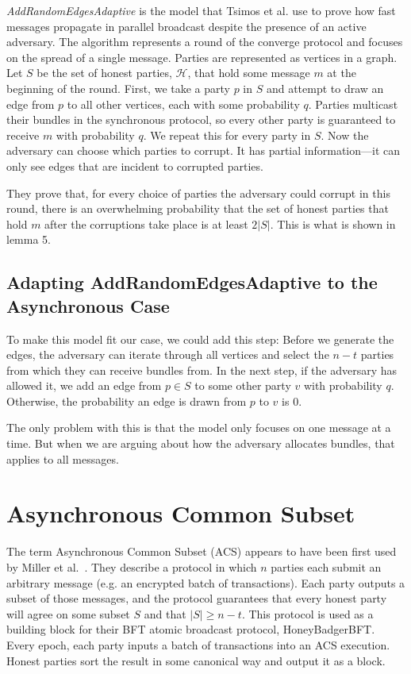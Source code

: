 \documentclass{article}
\begin{document}
\emph{AddRandomEdgesAdaptive} is the model that Tsimos et al. \cite{PBC} use to prove how fast messages propagate in parallel broadcast despite the presence of an active adversary. The algorithm represents a round of the converge protocol and focuses on the spread of a single message. Parties are represented as vertices in a graph. Let $S$ be the set of honest parties, $\mathcal H$, that hold some message $m$ at the beginning of the round. First, we take a party $p$ in $S$ and attempt to draw an edge from $p$ to all other vertices, each with some probability $q$. Parties multicast their bundles in the synchronous protocol, so every other party is guaranteed to receive $m$ with probability $q$. We repeat this for every party in $S$. Now the adversary can choose which parties to corrupt. It has partial information---it can only see edges that are incident to corrupted parties. 

They prove that, for every choice of parties the adversary could corrupt in this round, there is an overwhelming probability that the set of honest parties that hold $m$ after the corruptions take place is at least $2|S|$. This is what is shown in lemma 5.

\subsection{Adapting AddRandomEdgesAdaptive to the Asynchronous Case}
To make this model fit our case, we could add this step: Before we generate the edges, the adversary can iterate through all vertices and select the $n - t$ parties from which they can receive bundles from. In the next step, if the adversary has allowed it, we add an edge from $p \in S$ to some other party $v$ with probability $q$. Otherwise, the probability an edge is drawn from $p$ to $v$ is 0.

The only problem with this is that the model only focuses on one message at a time. But when we are arguing about how the adversary allocates bundles, that applies to all messages.

\section{Asynchronous Common Subset}
The term Asynchronous Common Subset (ACS) appears to have been first used by Miller et al.~\cite{miller2016honey}. They describe a protocol in which $n$ parties each submit an arbitrary message (e.g. an encrypted batch of transactions). Each party outputs a subset of those messages, and the protocol guarantees that every honest party will agree on some subset $S$ and that $|S| \geq n - t$. This protocol is used as a building block for their BFT atomic broadcast protocol, HoneyBadgerBFT. Every epoch, each party inputs a batch of transactions into an ACS execution. Honest parties sort the result in some canonical way and output it as a block.
\end{document}
